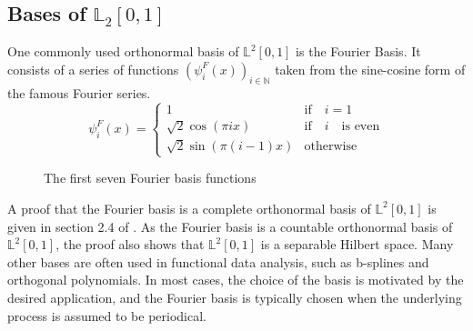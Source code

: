 \documentclass[12pt, a4paper]{article}
\theoremstyle{MAstyle} \newtheorem{assumption}{Assumption}[section]
\theoremstyle{MAstyle} \newtheorem{definition}{Definition}[section]
\theoremstyle{MAstyle} \newtheorem{theorem}{Theorem}[section]
\begin{document}
		\subsection{Bases of $\mathbb{L}_2[0,1]$}\label{bases_L2}
			One commonly used orthonormal basis of $\mathbb{L}^2[0,1]$ is the Fourier Basis. It consists of a series of functions $\left(\psi_{i}^{F}(x)\right)_{i \in \mathbb{N}}$ taken from the sine-cosine form of the famous Fourier series.
			\begin{equation}
				\psi_{i}^{F}(x) = 
				\begin{cases}
					1 & \text{if} \quad i = 1\\
					\sqrt{2} \cos(\pi i x) & \text{if} \quad i \quad \text{is even} \\
					\sqrt{2} \sin(\pi (i-1)x) & \text{otherwise}
				\end{cases}
			\end{equation}
			\begin{figure}[H]
				\caption{The first seven Fourier basis functions}
				\label{fourier_basis}
			\end{figure}
			A proof that the Fourier basis is a complete orthonormal basis of $\mathbb{L}^2[0,1]$ is given in section 2.4 of \cite{hsing_theoretical_2015}. As the Fourier basis is a countable orthonormal basis of $\mathbb{L}^2[0,1]$, the proof also shows that $\mathbb{L}^2[0,1]$ is a separable Hilbert space.
			Many other bases are often used in functional data analysis, such as b-splines and orthogonal polynomials. In most cases, the choice of the basis is motivated by the desired application, and the Fourier basis is typically chosen when the underlying process is assumed to be periodical.
	
\end{document}
